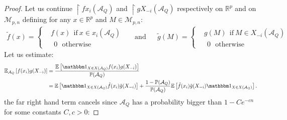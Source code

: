 \documentclass[a4papaer, titlepage]{book}
\begin{document}
\begin{proof}
Let us continue $\restriction{f}{x_i(\mathcal A_Q)}$ and $\restriction{g}{X_{-i}(\mathcal A_Q)}$ respectively on $\mathbb R^p$ and on $\mathcal M_{p,n}$ defining for any $x \in \mathbb R^p$ and $M \in \mathcal M_{p,n}$:
    \begin{align*}
      \tilde f(x) = \left\{
      \begin{aligned}
        &f(x) \ \ \text{if} \ x \in x_i(\mathcal A_Q)\\
        & \ \ 0 \ \ \ \text{otherwise}
      \end{aligned}\right.&
      &\text{and}&
      &\tilde g(M) = \left\{
      \begin{aligned}
        &g(M) \ \ \text{if} \ M \in X_{-i}(\mathcal A_Q)\\
        & \ \ 0 \ \ \ \text{otherwise}
      \end{aligned}\right.&
    \end{align*}
  Let us estimate:
  \begin{align*}%
      \mathbb E_{\mathcal A_Q} \left[  f(x_i) g(X_{-i})\right]
      &= \frac{\mathbb E \left[ \un_{X \in X(\mathcal A_Q)} f(x_i) g(X_{-i})\right]}{\mathbb P(\mathcal A_Q)}\\
      &= \mathbb E \left[ \un_{X \in X(\mathcal A_Q)} \tilde f(x_i) \tilde g(X_{-i}) \right] + \frac{1 - \mathbb P(\mathcal A_Q)}{\mathbb P(\mathcal A_Q)}\mathbb E \left[ \tilde f(x_i) \tilde g(X_{-i}) \un_{X \in X(\mathcal A_Q)} \right].
  \end{align*} 
  the far right hand term cancels since $\mathcal A_Q$ has a probability bigger than $1 -Ce^{-cn}$ for some constants $C,c>0$:

\end{proof}
\end{document}
